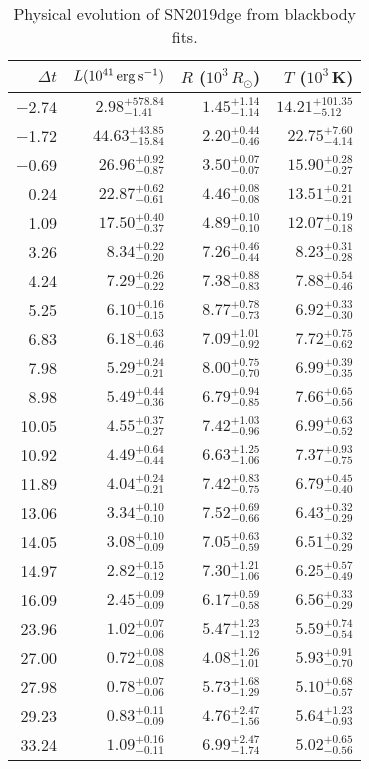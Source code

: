 \begin{table}[!htbp] 
	\centering 
	\caption{Physical evolution of SN2019dge from blackbody fits.} 
	\begin{tabular}{rrrr} 
		\hline 
		$\Delta t$ & $L (10^{41} \,{\rm erg\,s^{-1}})$ & $R$ ($10^{3}\,R_\odot$) & $T$ ($10^3$\,K) \\ 
		\hline
		$-$2.74 & $2.98^{+578.84}_{-1.41}$ &$1.45^{+1.14}_{-1.14}$ &$14.21^{+101.35}_{-5.12}$  \\
		$-$1.72 & $44.63^{+43.85}_{-15.84}$ &$2.20^{+0.44}_{-0.46}$ &$22.75^{+7.60}_{-4.14}$  \\
		$-$0.69 & $26.96^{+0.92}_{-0.87}$ &$3.50^{+0.07}_{-0.07}$ &$15.90^{+0.28}_{-0.27}$  \\
		0.24 & $22.87^{+0.62}_{-0.61}$ &$4.46^{+0.08}_{-0.08}$ &$13.51^{+0.21}_{-0.21}$  \\
		1.09 & $17.50^{+0.40}_{-0.37}$ &$4.89^{+0.10}_{-0.10}$ &$12.07^{+0.19}_{-0.18}$  \\
		3.26 & $8.34^{+0.22}_{-0.20}$ &$7.26^{+0.46}_{-0.44}$ &$8.23^{+0.31}_{-0.28}$  \\
		4.24 & $7.29^{+0.26}_{-0.22}$ &$7.38^{+0.88}_{-0.83}$ &$7.88^{+0.54}_{-0.46}$  \\
		5.25 & $6.10^{+0.16}_{-0.15}$ &$8.77^{+0.78}_{-0.73}$ &$6.92^{+0.33}_{-0.30}$  \\
		6.83 & $6.18^{+0.63}_{-0.46}$ &$7.09^{+1.01}_{-0.92}$ &$7.72^{+0.75}_{-0.62}$  \\
		7.98 & $5.29^{+0.24}_{-0.21}$ &$8.00^{+0.75}_{-0.70}$ &$6.99^{+0.39}_{-0.35}$  \\
		8.98 & $5.49^{+0.44}_{-0.36}$ &$6.79^{+0.94}_{-0.85}$ &$7.66^{+0.65}_{-0.56}$  \\
		10.05 & $4.55^{+0.37}_{-0.27}$ &$7.42^{+1.03}_{-0.96}$ &$6.99^{+0.63}_{-0.52}$  \\
		10.92 & $4.49^{+0.64}_{-0.44}$ &$6.63^{+1.25}_{-1.06}$ &$7.37^{+0.93}_{-0.75}$  \\
		11.89 & $4.04^{+0.24}_{-0.21}$ &$7.42^{+0.83}_{-0.75}$ &$6.79^{+0.45}_{-0.40}$  \\
		13.06 & $3.34^{+0.10}_{-0.10}$ &$7.52^{+0.69}_{-0.66}$ &$6.43^{+0.32}_{-0.29}$  \\
		14.05 & $3.08^{+0.10}_{-0.09}$ &$7.05^{+0.63}_{-0.59}$ &$6.51^{+0.32}_{-0.29}$  \\
		14.97 & $2.82^{+0.15}_{-0.12}$ &$7.30^{+1.21}_{-1.06}$ &$6.25^{+0.57}_{-0.49}$  \\
		16.09 & $2.45^{+0.09}_{-0.09}$ &$6.17^{+0.59}_{-0.58}$ &$6.56^{+0.33}_{-0.29}$  \\
		23.96 & $1.02^{+0.07}_{-0.06}$ &$5.47^{+1.23}_{-1.12}$ &$5.59^{+0.74}_{-0.54}$  \\
		27.00 & $0.72^{+0.08}_{-0.08}$ &$4.08^{+1.26}_{-1.01}$ &$5.93^{+0.91}_{-0.70}$  \\
		27.98 & $0.78^{+0.07}_{-0.06}$ &$5.73^{+1.68}_{-1.29}$ &$5.10^{+0.68}_{-0.57}$  \\
		29.23 & $0.83^{+0.11}_{-0.09}$ &$4.76^{+2.47}_{-1.56}$ &$5.64^{+1.23}_{-0.93}$  \\
		33.24 & $1.09^{+0.16}_{-0.11}$ &$6.99^{+2.47}_{-1.74}$ &$5.02^{+0.65}_{-0.56}$  \\
		\hline 
	\end{tabular} 
	\label{tab:bbfit} 
\end{table} 
